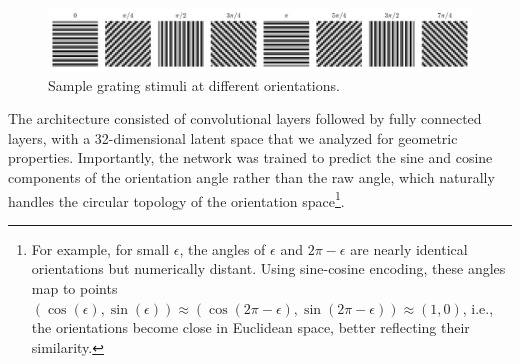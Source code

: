 \documentclass[11pt,a4paper]{article}
\begin{document}
\begin{figure}[h]
    \centering
    \includegraphics[width=\linewidth]{results/grating_samples.pdf}
    \caption{Sample grating stimuli at different orientations.}
    \label{fig:grating_samples}
\end{figure}

The architecture consisted of convolutional layers followed by fully connected layers, with a 32-dimensional latent space that we analyzed for geometric properties. Importantly, the network was trained to predict the sine and cosine components of the orientation angle rather than the raw angle, which naturally handles the circular topology of the orientation space\footnote{For example, for small $\epsilon$, the angles of $\epsilon$ and $2\pi - \epsilon$ are nearly identical orientations but numerically distant. Using sine-cosine encoding, these angles map to points $(\cos(\epsilon), \sin(\epsilon)) \approx (\cos(2\pi-\epsilon), \sin(2\pi - \epsilon)) \approx (1, 0)$, i.e., the orientations become close in Euclidean space, better reflecting their similarity.}.
\end{document}
